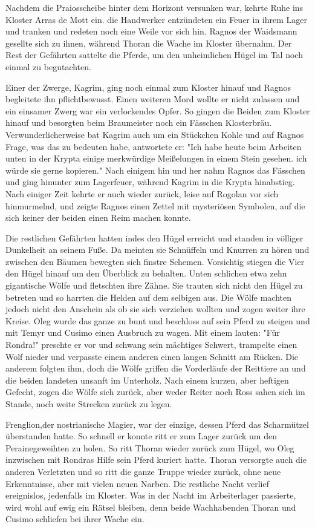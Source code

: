 Nachdem die Praiosscheibe hinter dem Horizont versunken war, kehrte Ruhe ins Kloster Arras de Mott ein. die Handwerker entzündeten ein Feuer in ihrem Lager und tranken und redeten noch eine Weile vor sich hin. Ragnos der Waidsmann gesellte sich zu ihnen, während Thoran die Wache im Kloster übernahm. Der Rest der Gefährten sattelte die Pferde, um den unheimlichen Hügel im Tal noch einmal zu begutachten.\par
Einer der Zwerge, Kagrim, ging noch einmal zum Kloster hinauf und Ragnos begleitete ihn pflichtbewusst. Einen weiteren Mord wollte er nicht zulassen und ein einsamer Zwerg war ein verlockendes Opfer. So gingen die Beiden zum Kloster hinauf und besorgten beim Braumeister noch ein Fässchen Klosterbräu. Verwunderlicherweise bat Kagrim auch um ein Stückchen Kohle und auf Ragnos Frage, was das zu bedeuten habe, antwortete er: "Ich habe heute beim Arbeiten unten in der Krypta einige merkwürdige Meißelungen in einem Stein gesehen. ich würde sie gerne kopieren." Nach einigem hin und her nahm Ragnos das Fässchen und ging hinunter zum Lagerfeuer, während Kagrim in die Krypta hinabstieg. Nach einiger Zeit kehrte er auch wieder zurück, leise auf Rogolan vor sich hinmurmelnd, und zeigte Ragnos einen Zettel mit mysteriösen Symbolen, auf die sich keiner der beiden einen Reim machen konnte.\par
Die restlichen Gefährten hatten indes den Hügel erreicht und standen in völliger Dunkelheit an seinem Fuße. Da meinten sie Schnüffeln und Knurren zu hören und zwischen den Bäumen bewegten sich finstre Schemen. Vorsichtig stiegen die Vier den Hügel hinauf um den Überblick zu behalten. Unten schlichen etwa zehn gigantische Wölfe und fletschten ihre Zähne. Sie trauten sich nicht den Hügel zu betreten und so harrten die Helden auf dem selbigen aus. Die Wölfe machten jedoch nicht den Anschein als ob sie sich verziehen wollten und zogen weiter ihre Kreise. Oleg wurde das ganze zu bunt und beschloss auf sein Pferd zu steigen und mit Temyr und Cusimo einen Ausbruch zu wagen. Mit einem lauten: "Für Rondra!" preschte er vor und schwang sein mächtiges Schwert, trampelte einen Wolf nieder und verpasste einem anderen einen langen Schnitt am Rücken. Die anderem folgten ihm, doch die Wölfe griffen die Vorderläufe der Reittiere an und die beiden landeten unsanft im Unterholz. Nach einem kurzen, aber heftigen Gefecht, zogen die Wölfe sich zurück, aber weder Reiter noch Ross sahen sich im Stande, noch weite Strecken zurück zu legen.\par
Frenglion,der nostrianische Magier, war der einzige, dessen Pferd das Scharmützel überstanden hatte. So schnell er konnte ritt er zum Lager zurück um den Perainegeweihten zu holen. So ritt Thoran wieder zurück zum Hügel, wo Oleg inzwischen mit Rondras Hilfe sein Pferd kuriert hatte. Thoran versorgte auch die anderen Verletzten und so ritt die ganze Truppe wieder zurück, ohne neue Erkenntnisse, aber mit vielen neuen Narben. Die restliche Nacht verlief ereignislos, jedenfalls im Kloster. Was in der Nacht im Arbeiterlager passierte, wird wohl auf ewig ein Rätsel bleiben, denn beide Wachhabenden Thoran und Cusimo schliefen bei ihrer Wache ein.\par
